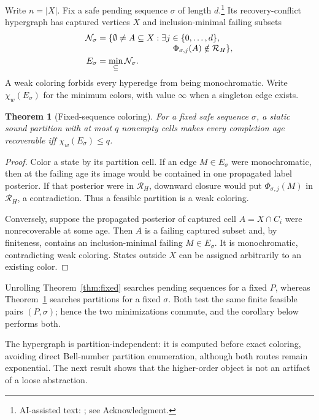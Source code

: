 \documentclass[letterpaper,10pt,conference]{ieeeconf}
\newtheorem{theorem}{Theorem}
\newcommand{\cR}{\mathcal R}
\begin{document}
Write $n=|X|$. Fix a safe pending sequence $\sigma$ of length $d$.\footnote{AI-assisted text:
\cite{openai2026codex}; see Acknowledgment.} Its recovery-conflict hypergraph has captured
vertices $X$ and inclusion-minimal failing subsets
\begin{align}
 \mathcal N_\sigma
   &=\{\emptyset\ne A\subseteq X:\exists j\in\{0,\ldots,d\},\nonumber\\[-1mm]
   &\hspace{31mm}\Phi_{\sigma,j}(A)\notin\cR_H\},\nonumber\\
 E_\sigma&=\min_{\subseteq}\mathcal N_\sigma.                 \label{eq:hypergraph}
\end{align}
A weak coloring forbids every hyperedge from being monochromatic. Write $\chi_w(E_\sigma)$ for
the minimum colors, with value $\infty$ when a singleton edge exists.

\begin{theorem}[Fixed-sequence coloring]\label{thm:coloring}
For a fixed safe sequence $\sigma$, a static sound partition with at most $q$ nonempty cells makes
every completion age recoverable iff \mbox{$\chi_w(E_\sigma)\le q$}.
\end{theorem}
\begin{proof}
Color a state by its partition cell. If an edge $M\in E_\sigma$ were monochromatic, then at the
failing age its image would be contained in one propagated label posterior. If that posterior were
in $\cR_H$, downward closure would put $\Phi_{\sigma,j}(M)$ in $\cR_H$, a contradiction. Thus a
feasible partition is a weak coloring.

Conversely, suppose the propagated posterior of captured cell $A=X\cap C_i$ were nonrecoverable
at some age. Then $A$ is a failing captured subset and, by finiteness, contains an
inclusion-minimal failing $M\in E_\sigma$. It is monochromatic, contradicting weak coloring.
States outside $X$ can be assigned arbitrarily to an existing color.
\end{proof}

Unrolling Theorem~\ref{thm:fixed} searches pending sequences for a fixed $P$, whereas
Theorem~\ref{thm:coloring} searches
partitions for a fixed $\sigma$. Both test the same finite feasible pairs $(P,\sigma)$; hence the
two minimizations commute, and the corollary below performs both.

The hypergraph is partition-independent: it is computed before exact coloring, avoiding direct
Bell-number partition enumeration, although both routes remain exponential. The next result shows
that the higher-order object is not an artifact of a loose abstraction.
\end{document}
